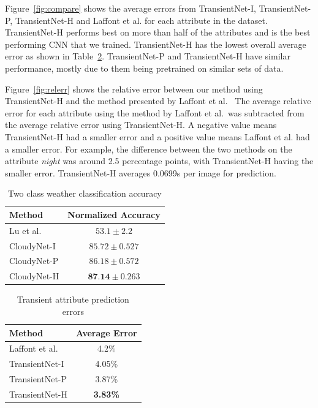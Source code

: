 \documentclass[10pt,twocolumn,letterpaper]{article}
\newcommand{\figref}[1]{Figure~\ref{fig:#1}}
\newcommand{\tblref}[1]{Table~\ref{tbl:#1}}
\begin{document}
\figref{compare} shows the average errors from TransientNet-I, TransientNet-P,
TransientNet-H and Laffont et al. for each attribute in the dataset.
TransientNet-H performs best on more than half of the attributes and is the
best performing CNN that we trained.  TransientNet-H has the lowest overall
average error as shown in \tblref{transient}.  TransientNet-P and
TransientNet-H have similar performance, mostly due to them being pretrained on
similar sets of data.

\figref{relerr} shows the relative error between our method using
TransientNet-H and the method presented by Laffont et al.~\cite{Laffont14}  The
average relative error for each attribute using the method by Laffont et al.\
was subtracted from the average relative error using TransientNet-H.  A
negative value means TransientNet-H had a smaller error and a positive value
means Laffont et al. had a smaller error.  For example, the difference between
the two methods on the attribute \emph{night} was around 2.5 percentage points,
with TransientNet-H having the smaller error.  TransientNet-H averages 0.0699s
per image for prediction. 

\begin{table}[t]
	\centering
	\begin{tabular}{ | l | c | }
		\hline
			Method & Normalized Accuracy \\ \hline \hline
			Lu et al.~\cite{lutwoclass}& $ 53.1 \pm 2.2 $ \\ \hline
			CloudyNet-I & $ 85.72 \pm 0.527 $ \\ \hline
			CloudyNet-P & $ 86.18 \pm 0.572 $ \\ \hline
			CloudyNet-H & $ \textbf{87.14} \pm 0.263 $ \\ 
		\hline
	\end{tabular}
	\caption{Two class weather classification accuracy}
	\label{tbl:twoclass}
\end{table}

\begin{table}[t]
	\centering
	\begin{tabular}{ | l | c | }
		\hline
			Method & Average Error \\ \hline \hline
			Laffont et al.~\cite{Laffont14}& 4.2\% \\ \hline
			TransientNet-I & 4.05\% \\ \hline
			TransientNet-P & 3.87\% \\ \hline
			TransientNet-H & \textbf{3.83\%} \\ 
		\hline
	\end{tabular}
	\caption{Transient attribute prediction errors}
	\label{tbl:transient}
\end{table}
\end{document}
